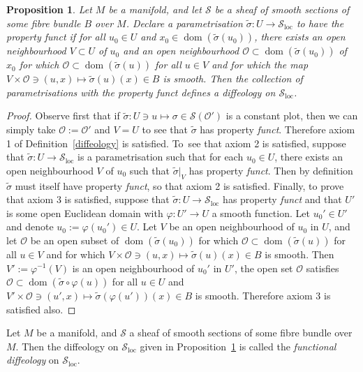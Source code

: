 \documentclass[11pt]{article}
\numberwithin{equation}{section}
\numberwithin{equation}{section}
\newtheorem{Proposition}[Theorem]{Proposition}
\def\loc{\operatorname{loc}}
\def\dom{\operatorname{dom}}
\def\OO{{\mathcal{O}}}
\def\SS{{\mathscr{S}}}
\begin{document}
\begin{Proposition}\label{functprop}
Let $M$ be a manifold, and let $\SS$ be a sheaf of smooth sections of some fibre bundle $B$ over $M$. Declare a parametrisation $\tilde{\sigma}\colon U\rightarrow \SS_{\loc}$ to have the property \textit{funct} if for all $u_{0}\in U$ and $x_{0}\in\dom(\tilde{\sigma}(u_{0}))$, there exists an open neighbourhood $V\subset U$ of $u_{0}$ and an open neighbourhood $\OO\subset \dom(\tilde{\sigma}(u_{0}))$ of $x_{0}$ for which $\OO\subset\dom(\tilde{\sigma}(u))$ for all $u\in V$ and for which the map $V\times\OO\ni(u,x)\mapsto\tilde{\sigma}(u)(x)\in B$ is smooth. Then the collection of parametrisations with the property \textit{funct} defines a diffeology on $\SS_{\loc}$.
\end{Proposition}

\begin{proof}
Observe first that if $\tilde{\sigma}\colon U\ni u\mapsto \sigma\in \SS(\mathcal{O}')$ is a constant plot, then we can simply take $\OO:=\OO'$ and $V = U$ to see that $\tilde{\sigma}$ has property \textit{funct}. Therefore axiom 1 of Definition~\ref{diffeology} is satisfied. To~see that axiom 2 is satisfied, suppose that $\tilde{\sigma}\colon U\rightarrow\SS_{\loc}$ is a parametrisation such that for each $u_{0}\in U$, there exists an open neighbourhood $V$ of $u_{0}$ such that $\tilde{\sigma}|_{V}$ has property \textit{funct}. Then by definition $\tilde{\sigma}$ must itself have property \textit{funct}, so that axiom 2 is satisfied. Finally, to prove that axiom 3 is satisfied, suppose that $\tilde{\sigma}\colon U\rightarrow\SS_{\loc}$ has property \textit{funct} and that $U'$ is some open Euclidean domain with $\varphi\colon U'\rightarrow U$ a smooth function. Let $u_{0}'\in U'$ and denote $u_{0}:=\varphi(u_{0}')\in U$. Let $V$ be an open neighbourhood of $u_{0}$ in $U$, and let $\OO$ be an open subset of $\dom(\tilde{\sigma}(u_{0}))$ for which $\OO\subset\dom(\tilde{\sigma}(u))$ for all $u\in V$ and for which $V\times\OO\ni(u,x)\mapsto\tilde{\sigma}(u)(x)\in B$ is smooth. Then $V':=\varphi^{-1}(V)$ is an open neighbourhood of $u_{0}'$ in $U'$, the open set $\OO$ satisfies $\OO\subset\dom(\tilde{\sigma}\circ\varphi(u))$ for all $u\in U$ and $V'\times\OO\ni(u',x)\mapsto\tilde{\sigma}(\varphi(u'))(x)\in B$ is smooth. Therefore axiom 3 is satisfied also.
\end{proof}

\begin{Definition}\label{funl}
Let $M$ be a manifold, and $\SS$ a sheaf of smooth sections of some fibre bundle over $M$. Then the diffeology on $\SS_{\loc}$ given in Proposition~\ref{functprop} is called the \textit{functional diffeology} on $\SS_{\loc}$.
\end{Definition}
\end{document}
